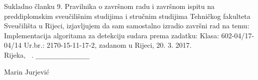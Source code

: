 

{ \large 
\vspace{15pt}
Sukladno članku 9. Pravilnika o završnom radu i završnom ispitu na
preddiplomskim sveučilišnim studijima i stručnim studijima Tehničkog fakulteta
Sveučilišta u Rijeci, izjavljujem
da sam samostalno izradio završni rad na temu: Implementacija algoritama za detekciju sudara
prema zadatku: Klasa: 602-04/17-04/14
Ur.br.: 2170-15-11-17-2, zadanom u Rijeci, 20. 3. 2017. \vspace{7cm} \\ 

\noindent Rijeka, \MONTH~\thisyear.   
\hspace{5.5cm}
	\verb|_______________|  %

\begin{flushright}
	\vspace{-15pt}
	Marin Jurjević
	\verb|      |   %
\end{flushright}

} %